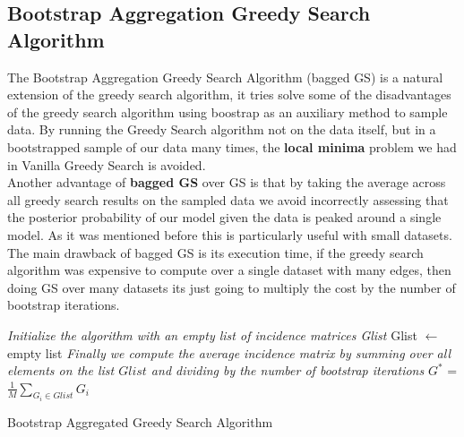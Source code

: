 \documentclass{article}
\begin{document}
	\subsection{Bootstrap Aggregation Greedy Search Algorithm}
	The Bootstrap Aggregation Greedy Search Algorithm (bagged GS) is a natural
	extension of the greedy search algorithm, it tries solve some of the
	disadvantages of the greedy search algorithm using boostrap as an auxiliary
	method to sample data. By running the Greedy Search algorithm not on the data
	itself, but in a bootstrapped sample of our data many times, the
	\textbf{local minima} problem we had in Vanilla Greedy Search is avoided. \\
	Another advantage of \textbf{bagged GS} over GS is that by taking the average
	across all greedy search results on the sampled data we avoid incorrectly
	assessing that the posterior probability of our model given the data is
	peaked around a single model. As it was mentioned before this is
	particularly useful with small datasets. \\
	The main drawback of bagged GS is its execution time, if the greedy search
	algorithm was expensive to compute over a single dataset with many edges,
	then doing GS over many datasets its just going to multiply the cost by the
	number of bootstrap iterations. 
		\begin{algorithm} %
			\SetAlgoLined
			\emph{Initialize the algorithm with an empty list of incidence matrices
			Glist}\;
			Glist $\gets$ empty list\; 
			\emph{Finally we compute the average incidence matrix by summing over all
				elements on the list $Glist$ and dividing by the number of bootstrap
			iterations}\;
			$G^{*}$ = $\frac{1}{M}\sum_{G_{i} \in Glist}G_{i}$
			\caption{Bootstrap Aggregated Greedy Search Algorithm}
			\label{alg:baggedgreedy}
	  \end{algorithm}	
\end{document}
